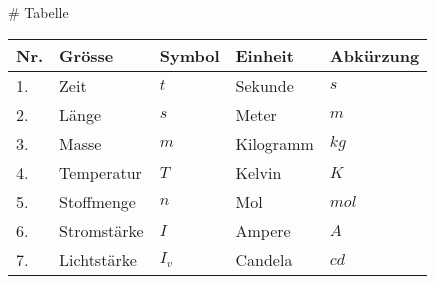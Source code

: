 # Tabelle
\begin{tabularx}{\columnwidth}{@{}lXlXl@{}}
    \hline
    Nr. & Grösse      & Symbol  & Einheit   & Abkürzung \\ \hline
    1.  & Zeit        & $ t $   & Sekunde   & $ s $     \\ \hline
    2.  & Länge       & $ s $   & Meter     & $ m $     \\ \hline
    3.  & Masse       & $ m $   & Kilogramm & $ kg $    \\ \hline
    4.  & Temperatur  & $ T $   & Kelvin    & $ K $     \\ \hline
    5.  & Stoffmenge  & $ n $   & Mol       & $ mol $   \\ \hline
    6.  & Stromstärke & $ I $   & Ampere    & $ A $     \\ \hline
    7.  & Lichtstärke & $ I_v $ & Candela   & $ cd $    \\ \hline
\end{tabularx}
\vspace{1mm}